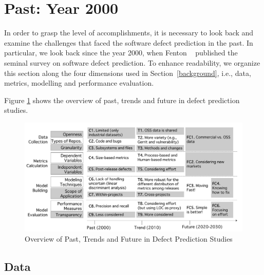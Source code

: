 \section{Past: Year 2000} \label{past}

In order to grasp the level of accomplishments, it is necessary to look back and examine the challenges that faced the software defect prediction in the past. In particular, we look back since the year 2000, when Fenton \ea~\cite{Fenton1999TSE} published the seminal survey on software defect prediction. To enhance readability, we organize this section along the four dimensions used in Section~\ref{background}, i.e., data, metrics, modelling and performance evaluation.


Figure \ref{fig:whole_picture} shows the overview of past, trends and future in defect prediction studies.

\begin{figure}
  \centering
  \includegraphics[width=.9\textwidth]{figures/whole_pitcture}
  \caption{Overview of Past, Trends and Future in Defect Prediction Studies \label{fig:whole_picture}}
\end{figure}

\subsection{Data}

